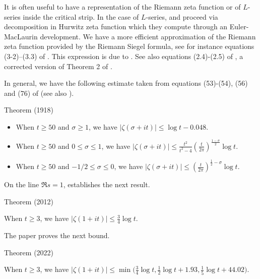 It is often useful to have a representation of the Riemann zeta function
or of $L$-series inside the critical strip. In the case of $L$-series,
\cite{Spira*69}
and
\cite{Rumely*93}
proceed via decomposition in Hurwitz zeta function which they compute through
an Euler-MacLaurin development. We have a more efficient approximation of the
Riemann zeta function provided by the Riemann Siegel formula, see
for instance equations (3-2)--(3.3)
of \cite{Odlyzko*87}. This
expression is due to 
\cite{Gabcke*79}.
See also 
equations (2.4)-(2.5) of
\cite{Lehman*66}, a corrected
version of Theorem 2 of \cite{Titchmarsh*47}.

\par 
In general, we have the following estimate taken from equations
(53)-(54), (56) and (76)
of  \cite{Backlund*18}
(see also \cite{Backlund*14}).
\par 
\begin{thm}{Theorem (1918)}

  \begin{itemize}
  \item When $t\ge 50$ and $\sigma\ge1$, we have $|\zeta(\sigma+it)|\le \log
  t-0.048$.

  \item  When $t\ge 50$ and $0\le \sigma\le1$, we have $|\zeta(\sigma+it)|\le
  \frac{t^2}{t^2-4}\left(\frac{t}{2\pi}\right)^{\frac{1-\sigma}{2}}\log t$.
  

  \item  When $t\ge 50$ and $-1/2\le \sigma\le0$, we have $|\zeta(\sigma+it)|\le
  \left(\frac{t}{2\pi}\right)^{\frac{1}{2}-\sigma}\log t$.
  

  \end{itemize}
\end{thm}



On the line $\Re s=1$, 
\cite{Trudgian*12b}
establishes the next result.
\par 
\begin{thm}{Theorem (2012)}

  When $t\ge 3$, we have $|\zeta(1+it)|\le\tfrac34 \log t$.
\end{thm}

The paper
\cite{Patel*22}
proves the next bound.
\par 
\begin{thm}{Theorem (2022)}

  When $t\ge 3$, we have
  $
  |\zeta(1+it)|\le\min\bigl(\tfrac34 \log t,
  \tfrac12\log t + 1.93, \tfrac15 \log t + 44.02\bigr).
  $
\end{thm}



